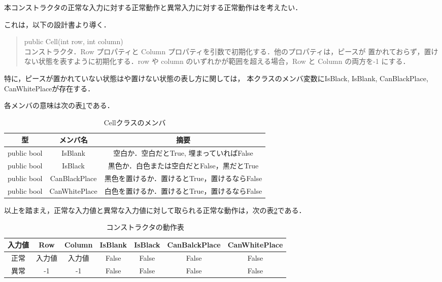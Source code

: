 \documentclass[platex,dvipdfmx,12pt]{jsarticle}
\begin{document}
本コンストラクタの正常な入力に対する正常動作と異常入力に対する正常動作はを考えたい．

これは，以下の設計書\cite{journal:sekkeisyo}より導く．

\begin{quote}
public Cell(int row, int column) \\

コンストラクタ．Row プロパティと Column プロパティを引数で初期化する．他のプロパティは，ピースが
置かれておらず，置けない状態を表すように初期化する．row や column のいずれかが範囲を超える場合，Row
と Column の両方を-1 にする．
\end{quote}

特に，ピースが置かれていない状態はや置けない状態の表し方に関しては，
本クラスのメンバ変数にIsBlack, IsBlank, CanBlackPlace, CanWhitePlaceが存在する．

各メンバの意味は次の表\ref{tab:cell-member-variable}である．

\begin{table}[H]
  \centering
  \caption{Cellクラスのメンバ}
  \label{tab:cell-member-variable}
  \begin{tabular}{ccc}
    型 & メンバ名 & 摘要 \\
    \hline
    public bool & IsBlank & 空白か．空白だとTrue, 埋まっていればFalse \\
    public bool & IsBlack & 黒色か．白色または空白だとFalse，黒だとTrue \\
    public bool & CanBlackPlace & 黒色を置けるか．置けるとTrue，置けるならFalse \\
    public bool & CanWhitePlace & 白色を置けるか．置けるとTrue，置けるならFalse \\
  \end{tabular}
\end{table}

以上を踏まえ，正常な入力値と異常な入力値に対して取られる正常な動作は，次の表\ref{tab:enshu5-cell-const}である．

\begin{table}[H]
  \centering
  \caption{コンストラクタの動作表}
  \label{tab:enshu5-cell-const}
  \begin{tabular}{ccccccc}
    入力値 & Row & Column & IsBlank & IsBlack & CanBalckPlace & CanWhitePlace\\
    \hline
    正常 & 入力値 & 入力値 & False & False & False & False\\
    異常 & -1 & -1 & False & False & False & False\\
  \end{tabular}
\end{table}
\end{document}
